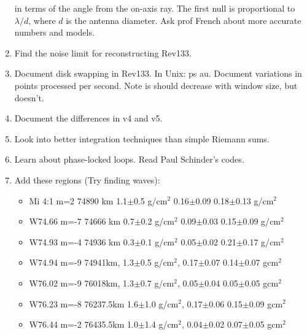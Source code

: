 \documentclass[crop=false,class=article,oneside]{standalone}
\begin{document}
\begin{enumerate}
                  in terms of the angle from the on-axis ray.
                  The first null is proportional to $\lambda/d$, where
                  $d$ is the antenna diameter. Ask prof French about
                  more accurate numbers and models.
            \item Find the noise limit for reconstructing Rev133.
            \item Document disk swapping in Rev133. In Unix: ps au.
                  Document variations in points processed per second.
                  Note is should decrease with window size, but
                  doesn't.
            \item Document the differences in v4 and v5.
            \item Look into better integration techniques than simple
                  Riemann sums.
            \item Learn about phase-locked loops. Read Paul Schinder's
                  codes.
            \item Add these regions (Try finding waves):
            \begin{itemize}
                \item Mi 4:1 m=2  74890 km  1.1$\pm$0.5 g/$\textrm{cm}^2$  0.16$\pm$0.09  0.18$\pm$0.13 g/$\textrm{cm}^2$
                \item W74.66 m=-7 74666 km  0.7$\pm$0.2 g/$\textrm{cm}^2$  0.09$\pm$0.03  0.15$\pm$0.09 g/$\textrm{cm}^2$
                \item W74.93 m=-4 74936 km  0.3$\pm$0.1 g/$\textrm{cm}^2$  0.05$\pm$0.02  0.21$\pm$0.17 g/$\textrm{cm}^2$
                \item W74.94 m=-9 74941km,  1.3$\pm$0.5 g/$\textrm{cm}^2$, 0.17$\pm$0.07  0.14$\pm$0.07 g$\textrm{cm}^2$
                \item W76.02 m=-9 76018km,  1.3$\pm$0.7 g/$\textrm{cm}^2$, 0.05$\pm$0.04  0.05$\pm$0.05 g$\textrm{cm}^2$
                \item W76.23 m=-8 76237.5km 1.6$\pm$1.0 g/$\textrm{cm}^2$, 0.17$\pm$0.06  0.15$\pm$0.09 g$\textrm{cm}^2$
                \item W76.44 m=-2 76435.5km 1.0$\pm$1.4 g/$\textrm{cm}^2$, 0.04$\pm$0.02  0.07$\pm$0.05 g$\textrm{cm}^2$
            \end{itemize}
            \begin{itemize}
\end{itemize}
\end{enumerate}
\end{document}
